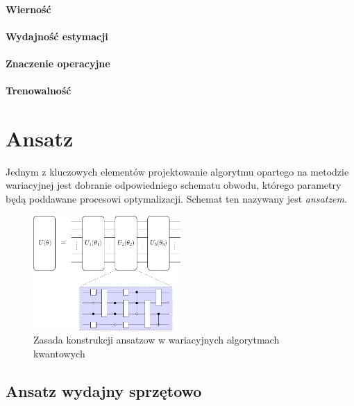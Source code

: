 \documentclass[a4paper,11pt]{article}
\begin{document}
\paragraph{Wierność}
\paragraph{Wydajność estymacji}
\paragraph{Znaczenie operacyjne}
\paragraph{Trenowalność}

\newpage 

\hypertarget{typy-ansatzow}{%
	\section{Ansatz}\label{typy-ansatzow}}

Jednym z kluczowych elementów projektowanie algorytmu opartego na metodzie wariacyjnej jest dobranie odpowiedniego schematu obwodu, którego parametry będą poddawane procesowi optymalizacji. Schemat ten nazywany jest \emph{ansatzem}.


\begin{figure}[ht!]
	\centering
	\includegraphics[width=0.5\textwidth]{ansatz.pdf}
	\caption{Zasada konstrukcji ansatzow w wariacyjnych algorytmach kwantowych}
\end{figure}






\subsection{Ansatz wydajny sprzętowo}
\end{document}
